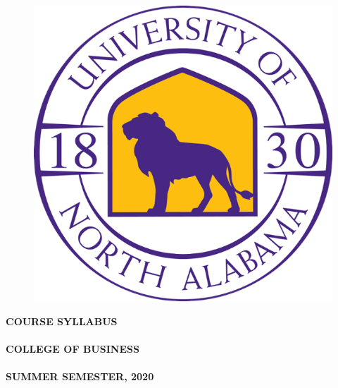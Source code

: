 \documentclass[12pt]{letter}
\newlength{\logowidth}
\newcommand{\customhref}[2]{
	\href{#1}{\color{blue}\burl{#2}}	
}
\newcommand{\semester}{SUMMER SEMESTER, 2020}
\begin{document}
\thispagestyle{empty}


\begin{large}


\begin{figure}
 \includegraphics[width=\logowidth]{img/approved_una_logo}
\end{figure}

\textbf{COURSE SYLLABUS}\\ \\
\textbf{COLLEGE OF BUSINESS}\\ \\
\textbf{\semester}
 
  \vspace*{28pt}
  \textbf{\course} \\ \\ 
  \textbf{\coursetitle}
\end{large}
\end{document}
